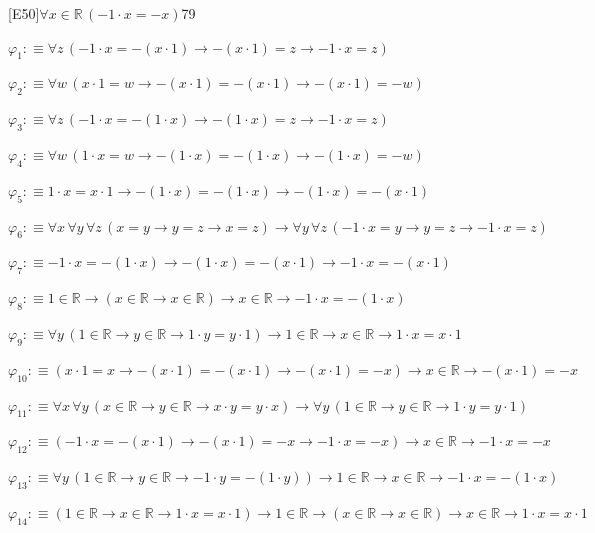 \begin{fullproof}{[E50]}{$\forall x \in \mathbb{R}\,(-1 \cdot x = -x)$}{79}
\begin{ptree}
\end{ptree}
\begin{abbrevlist}
\item $\varphi_{1} :\equiv \forall z\,(-1 \cdot x = -(x \cdot 1) \to -(x \cdot 1) = z \to -1 \cdot x = z)$
\item $\varphi_{2} :\equiv \forall w\,(x \cdot 1 = w \to -(x \cdot 1) = -(x \cdot 1) \to -(x \cdot 1) = -w)$
\item $\varphi_{3} :\equiv \forall z\,(-1 \cdot x = -(1 \cdot x) \to -(1 \cdot x) = z \to -1 \cdot x = z)$
\item $\varphi_{4} :\equiv \forall w\,(1 \cdot x = w \to -(1 \cdot x) = -(1 \cdot x) \to -(1 \cdot x) = -w)$
\item $\varphi_{5} :\equiv 1 \cdot x = x \cdot 1 \to -(1 \cdot x) = -(1 \cdot x) \to -(1 \cdot x) = -(x \cdot 1)$
\item $\varphi_{6} :\equiv \forall x\,\forall y\,\forall z\,(x = y \to y = z \to x = z) \to \forall y\,\forall z\,(-1 \cdot x = y \to y = z \to -1 \cdot x = z)$
\item $\varphi_{7} :\equiv -1 \cdot x = -(1 \cdot x) \to -(1 \cdot x) = -(x \cdot 1) \to -1 \cdot x = -(x \cdot 1)$
\item $\varphi_{8} :\equiv 1 \in \mathbb{R} \to (x \in \mathbb{R} \to x \in \mathbb{R}) \to x \in \mathbb{R} \to -1 \cdot x = -(1 \cdot x)$
\item $\varphi_{9} :\equiv \forall y\,(1 \in \mathbb{R} \to y \in \mathbb{R} \to 1 \cdot y = y \cdot 1) \to 1 \in \mathbb{R} \to x \in \mathbb{R} \to 1 \cdot x = x \cdot 1$
\item $\varphi_{10} :\equiv (x \cdot 1 = x \to -(x \cdot 1) = -(x \cdot 1) \to -(x \cdot 1) = -x) \to x \in \mathbb{R} \to -(x \cdot 1) = -x$
\item $\varphi_{11} :\equiv \forall x\,\forall y\,(x \in \mathbb{R} \to y \in \mathbb{R} \to x \cdot y = y \cdot x) \to \forall y\,(1 \in \mathbb{R} \to y \in \mathbb{R} \to 1 \cdot y = y \cdot 1)$
\item $\varphi_{12} :\equiv (-1 \cdot x = -(x \cdot 1) \to -(x \cdot 1) = -x \to -1 \cdot x = -x) \to x \in \mathbb{R} \to -1 \cdot x = -x$
\item $\varphi_{13} :\equiv \forall y\,(1 \in \mathbb{R} \to y \in \mathbb{R} \to -1 \cdot y = -(1 \cdot y)) \to 1 \in \mathbb{R} \to x \in \mathbb{R} \to -1 \cdot x = -(1 \cdot x)$
\item $\varphi_{14} :\equiv (1 \in \mathbb{R} \to x \in \mathbb{R} \to 1 \cdot x = x \cdot 1) \to 1 \in \mathbb{R} \to (x \in \mathbb{R} \to x \in \mathbb{R}) \to x \in \mathbb{R} \to 1 \cdot x = x \cdot 1$

\end{abbrevlist}
\end{fullproof}
